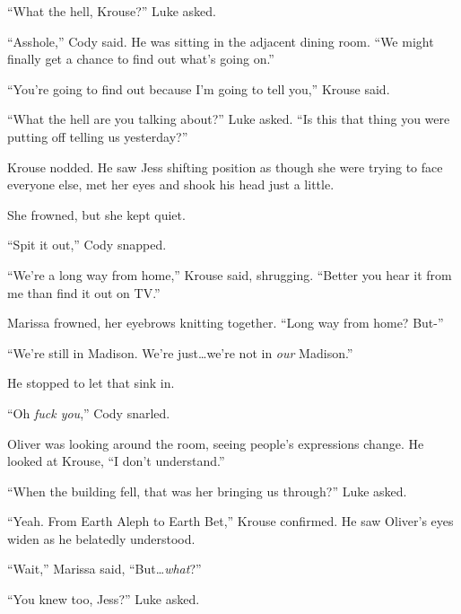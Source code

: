 ``What the hell, Krouse?'' Luke asked.



``Asshole,'' Cody said.  He was sitting in the adjacent dining room.  ``We might finally get a chance to find out what's going on.''



``You're going to find out because I'm going to tell you,'' Krouse said.



``What the hell are you talking about?'' Luke asked.  ``Is this that thing you were putting off telling us yesterday?''



Krouse nodded.  He saw Jess shifting position as though she were trying to face everyone else, met her eyes and shook his head just a little.



She frowned, but she kept quiet.



``Spit it out,'' Cody snapped.



``We're a long way from home,'' Krouse said, shrugging.  ``Better you hear it from me than find it out on TV.''



Marissa frowned, her eyebrows knitting together.  ``Long way from home?  But-''



``We're still in Madison.  We're just\ldots we're not in \emph{our} Madison.''



He stopped to let that sink in.



``Oh \emph{fuck you},'' Cody snarled.



Oliver was looking around the room, seeing people's expressions change.  He looked at Krouse, ``I don't understand.''



``When the building fell, that was her bringing us through?'' Luke asked.



``Yeah.  From Earth Aleph to Earth Bet,'' Krouse confirmed.  He saw Oliver's eyes widen as he belatedly understood.



``Wait,'' Marissa said, ``But\ldots \emph{what}?''



``You knew too, Jess?'' Luke asked.



